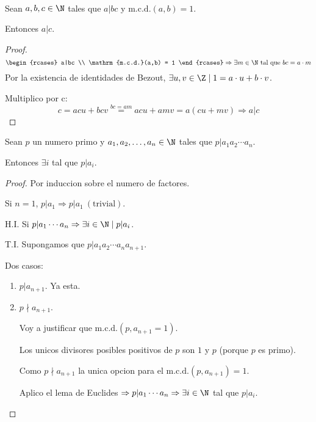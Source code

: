 \begin{lemma}[de Euclides]
	~ \\ Sean \(a,b,c \in \N \) tales que \(a|bc \) y \(\mathrm{m.c.d.}(a,b) = 1 \).

	Entonces \(a|c \).
\end{lemma}
\begin{proof}
	\[
		\begin{rcases}
			a|bc \\
			\mathrm{m.c.d.}(a,b) = 1
		\end{rcases} \Rightarrow \exists m \in \N \text{ tal que } bc = a \cdot m
	\]
	Por la existencia de identidades de Bezout, \(\exists u,v \in \Z \mid 1 = a \cdot u + b \cdot v \).

	Multiplico por c:
	\[
		c = acu + bcv \overset{bc=am}{=} acu + amv = a(cu + mv) \Rightarrow a|c
	\]
\end{proof}

\begin{corollary}
	Sean \(p \) un numero primo y \(a_1,a_2,\ldots,a_n \in \N \) tales que \(p|a_{1}a_2 \cdots a_n \).

	Entonces \(\exists i \) tal que \(p | a_i \).
\end{corollary}
\begin{proof}
	Por induccion sobre el numero de factores.

	Si \(n = 1 \), \(p|a_1 \Rightarrow p|{a_1}\ (\text{trivial}).\)

	H.I. Si \(p|a_1\cdots a_n \Rightarrow \exists i \in \N \mid p|a_i \).

	T.I. Supongamos que \(p|a_1 a_2 \cdots a_n a_{n+1}\).

	Dos casos:
	\begin{enumerate}
		\item \(p | a_{n+1 }\). Ya esta.
		\item \(p \nmid a_{n+1 }\).

		      Voy a justificar que \(\mathrm{m.c.d.}(p, a_{n+1} = 1)\).

		      Los unicos divisores posibles positivos de \(p \) son \(1 \) y \(p \) (porque \(p \) es primo).

		      Como \(p \nmid a_{n+1}\) la unica opcion para el \(\mathrm{m.c.d.}(p,a_{n+1}) = 1 \).

		      Aplico el lema de Euclides \(\Rightarrow p | a_1 \cdots a_n \Rightarrow \exists i \in \N \) tal que \(p | a_i \).
	\end{enumerate}
\end{proof}

